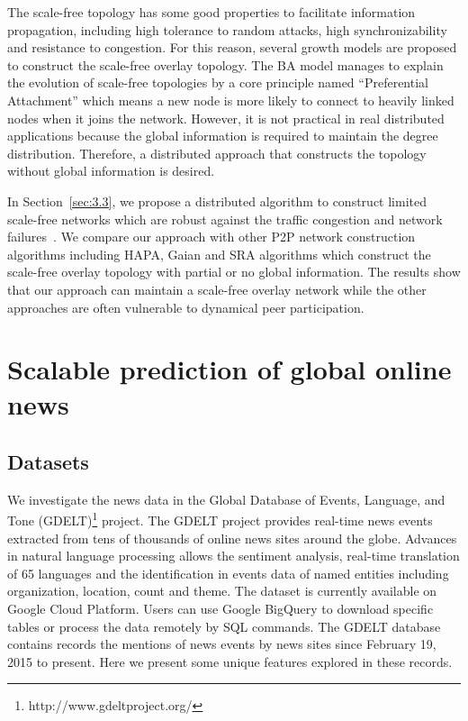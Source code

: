 The scale-free topology has some good properties to facilitate information propagation, including high tolerance to random attacks\cite{albert2000error}, high synchronizability\cite{korniss2007synchronization} and resistance to congestion\cite{toroczkai2004network}. For this reason, several growth models are proposed to construct the scale-free overlay topology. The BA model\cite{barabasi1999emergence} manages to explain the evolution of scale-free topologies by a core principle named ``Preferential Attachment'' which means a new node is more likely to connect to heavily linked nodes when it joins the network. However, it is not practical in real distributed applications because the global information is required to maintain the degree distribution. Therefore, a distributed approach that constructs the topology without global information is desired.

In Section~\ref{sec:3.3}, we propose a distributed algorithm to construct limited scale-free networks which are robust against the traffic congestion and network failures~\cite{lu2016towards}. We compare our approach with other P2P network construction algorithms including HAPA\cite{guclu2009limited}, Gaian\cite{bent2008dynamic} and SRA\cite{bulut2014constructing} algorithms which construct the scale-free overlay topology with partial or no global information. The results show that our approach can maintain a scale-free overlay network while the other approaches are often vulnerable to dynamical peer participation. 

\section{Scalable prediction of global online news} \label{sec:3.2}

\subsection{Datasets} \label{sec:3.2.1}
We investigate the news data in the Global Database of Events, Language, and Tone (GDELT)\footnote{http://www.gdeltproject.org/} project. The GDELT project provides real-time news events extracted from tens of thousands of online news sites around the globe. Advances in natural language processing allows the sentiment analysis, real-time translation of 65 languages and the identification in events data of named entities including organization, location, count and theme. The dataset is currently available on Google Cloud Platform. Users can use Google BigQuery to download specific tables or process the data remotely by SQL commands. The GDELT database contains records the mentions of news events by news sites since February 19, 2015 to present. Here we present some unique features explored in these records. 

